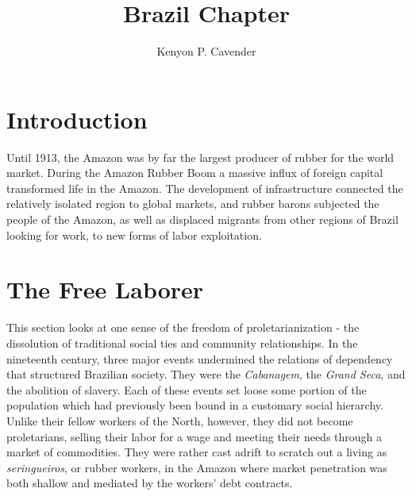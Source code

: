\documentclass[12pt]{article}
\begin{document}
\title{Brazil Chapter}
\author{Kenyon P. Cavender}
\maketitle

\section{Introduction}
Until 1913, the Amazon was by far the largest producer of rubber for the world market. During the Amazon Rubber Boom a massive influx of foreign capital transformed life in the Amazon. The development of infrastructure connected the relatively isolated region to global markets, and rubber barons subjected the people of the Amazon, as well as displaced migrants from other regions of Brazil looking for work, to new forms of labor exploitation. 

\section{The Free Laborer}
This section looks at one sense of the freedom of proletarianization - the dissolution of traditional social ties and community relationships. In the nineteenth century, three major events undermined the relations of dependency that structured Brazilian society. They were the \textit{Cabanagem}, the \textit{Grand Seca}, and the abolition of slavery. Each of these events set loose some portion of the population which had previously been bound in a customary social hierarchy. Unlike their fellow workers of the North, however, they did not become proletarians, selling their labor for a wage and meeting their needs through a market of commodities. They were rather cast adrift to scratch out a living as \textit{seringueiros}, or rubber workers, in the Amazon where market penetration was both shallow and mediated by the workers' debt contracts.
\end{document}

